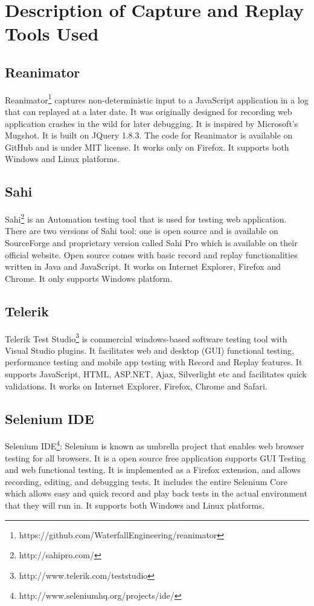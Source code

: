 \documentclass[10pt,journal]{IEEEtran}
\begin{document}
\section{Description of Capture and Replay Tools Used}
\subsection{Reanimator}
Reanimator\footnote{https://github.com/WaterfallEngineering/reanimator} captures non-deterministic input to a JavaScript application in a log that can replayed at a later date. It was originally designed for recording web application crashes in the wild for later debugging. It is inspired by Microsoft’s Mugshot. It is built on JQuery 1.8.3. The code for Reanimator is available on GitHub and is under MIT license. It works only on Firefox. It supports both Windows and Linux platforms.

\subsection{Sahi}
Sahi\footnote{http://sahipro.com/} is an Automation testing tool that is used for testing web application. There are two versions of Sahi tool: one is open source and is available on SourceForge and proprietary version called Sahi Pro which is available on their official website. Open source comes with basic record and replay functionalities written in Java and JavaScript. It works on Internet Explorer, Firefox and Chrome. It only supports Windows platform.

\subsection{Telerik}
Telerik Test Studio\footnote{http://www.telerik.com/teststudio} is commercial windows-based software testing tool with Visual Studio plugins. It facilitates web and desktop (GUI) functional testing, performance testing and mobile app testing with Record and Replay features. It supports JavaScript, HTML, ASP.NET, Ajax, Silverlight etc and facilitates quick validations. It works on Internet Explorer, Firefox, Chrome and Safari.

\subsection{Selenium IDE}
Selenium IDE\footnote{http://www.seleniumhq.org/projects/ide/}: Selenium is known as umbrella project that enables web browser testing for all browsers. It is a open source free application supports GUI Testing and web functional testing. It is implemented as a Firefox extension, and allows recording, editing, and debugging tests. It includes the entire Selenium Core which allows easy and quick record and play back tests in the actual environment that they will run in. It supports both Windows and Linux platforms.
\end{document}
